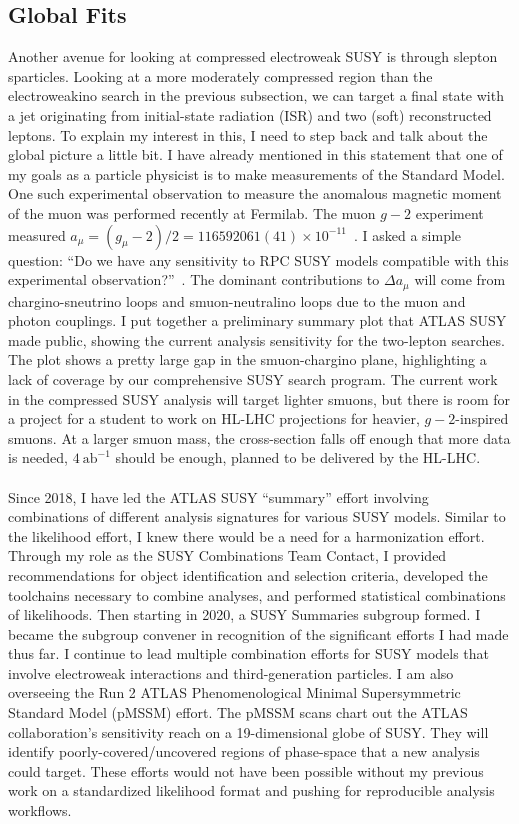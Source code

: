 \documentclass[10pt,a4paper,sans]{moderncv} %
\begin{document}
\subsection{Global Fits}
Another avenue for looking at compressed electroweak SUSY is through slepton sparticles. Looking at a more moderately compressed region than the electroweakino search in the previous subsection, we can target a final state with a jet originating from initial-state radiation (ISR) and two (soft) reconstructed leptons. To explain my interest in this, I need to step back and talk about the global picture a little bit. I have already mentioned in this statement that one of my goals as a particle physicist is to make measurements of the Standard Model. One such experimental observation to measure the anomalous magnetic moment of the muon was performed recently at Fermilab. The muon $g-2$ experiment measured $a_\mu = (g_\mu-2)/2 = 116 592 061 (41) \times 10^{-11}$~\cite{PhysRevLett.126.141801}. I asked a simple question: ``Do we have any sensitivity to RPC SUSY models compatible with this experimental observation?''~\cite{Chakraborti:2021dli}. The dominant contributions to $\Delta a_\mu$ will come from chargino-sneutrino loops and smuon-neutralino loops due to the muon and photon couplings. I put together a preliminary summary plot that ATLAS SUSY made public, showing the current analysis sensitivity for the two-lepton searches. The plot shows a pretty large gap in the smuon-chargino plane, highlighting a lack of coverage by our comprehensive SUSY search program. The current work in the compressed SUSY analysis will target lighter smuons, but there is room for a project for a student to work on HL-LHC projections for heavier, $g-2$-inspired smuons. At a larger smuon mass, the cross-section falls off enough that more data is needed, $4\ \mathrm{ab}^{-1}$ should be enough, planned to be delivered by the HL-LHC.
\\
\\
Since 2018, I have led the ATLAS SUSY ``summary'' effort involving combinations of different analysis signatures for various SUSY models. Similar to the likelihood effort, I knew there would be a need for a harmonization effort. Through my role as the SUSY Combinations Team Contact, I provided recommendations for object identification and selection criteria, developed the toolchains necessary to combine analyses, and performed statistical combinations of likelihoods. Then starting in 2020, a SUSY Summaries subgroup formed. I became the subgroup convener in recognition of the significant efforts I had made thus far. I continue to lead multiple combination efforts for SUSY models that involve electroweak interactions and third-generation particles. I am also overseeing the Run 2 ATLAS Phenomenological Minimal Supersymmetric Standard Model (pMSSM) effort. The pMSSM scans chart out the ATLAS collaboration's sensitivity reach on a 19-dimensional globe of SUSY. They will identify poorly-covered/uncovered regions of phase-space that a new analysis could target. These efforts would not have been possible without my previous work on a standardized likelihood format and pushing for reproducible analysis workflows.
\end{document}

